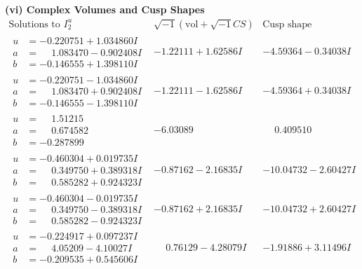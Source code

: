 \documentclass[1p]{elsarticle_modified}
\theoremstyle{definition}
\newcommand{\I}{\sqrt{-1}}
\begin{document}
\newpage\flushleft \textbf{(vi) Complex Volumes and Cusp Shapes}
$$\begin{array}{c|c|c}  
\text{Solutions to }I^u_{2}& \I (\text{vol} + \sqrt{-1}CS) & \text{Cusp shape}\\
 \hline 
\begin{aligned}
u &= -0.220751 + 1.034860 I \\
a &= \phantom{-}1.083470 - 0.902408 I \\
b &= -0.146555 + 1.398110 I\end{aligned}
 & -1.22111 + 1.62586 I & -4.59364 - 0.34038 I \\ \hline\begin{aligned}
u &= -0.220751 - 1.034860 I \\
a &= \phantom{-}1.083470 + 0.902408 I \\
b &= -0.146555 - 1.398110 I\end{aligned}
 & -1.22111 - 1.62586 I & -4.59364 + 0.34038 I \\ \hline\begin{aligned}
u &= \phantom{-}1.51215\phantom{ +0.000000I} \\
a &= \phantom{-}0.674582\phantom{ +0.000000I} \\
b &= -0.287899\phantom{ +0.000000I}\end{aligned}
 & -6.03089\phantom{ +0.000000I} & \phantom{-}0.409510\phantom{ +0.000000I} \\ \hline\begin{aligned}
u &= -0.460304 + 0.019735 I \\
a &= \phantom{-}0.349750 + 0.389318 I \\
b &= \phantom{-}0.585282 + 0.924323 I\end{aligned}
 & -0.87162 - 2.16835 I & -10.04732 - 2.60427 I \\ \hline\begin{aligned}
u &= -0.460304 - 0.019735 I \\
a &= \phantom{-}0.349750 - 0.389318 I \\
b &= \phantom{-}0.585282 - 0.924323 I\end{aligned}
 & -0.87162 + 2.16835 I & -10.04732 + 2.60427 I \\ \hline\begin{aligned}
u &= -0.224917 + 0.097237 I \\
a &= \phantom{-}4.05209 - 4.10027 I \\
b &= -0.209535 + 0.545606 I\end{aligned}
 & \phantom{-}0.76129 - 4.28079 I & -1.91886 + 3.11496 I \\ \hline\begin{aligned}

\end{aligned}
\end{array}$$
\end{document}
